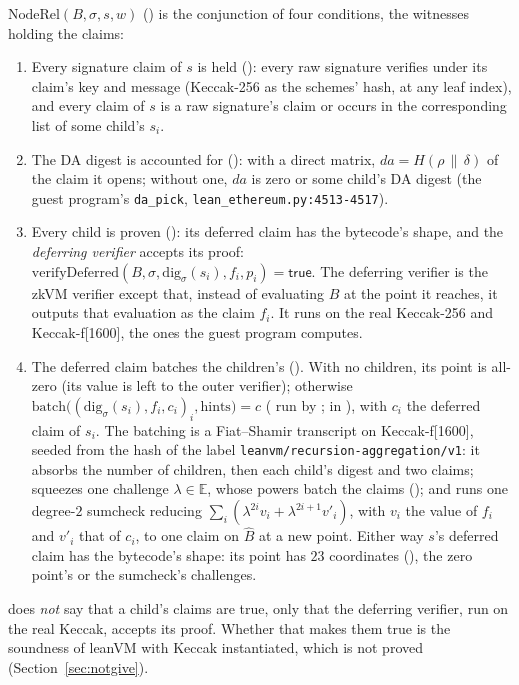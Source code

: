 \documentclass[11pt]{article}
\begin{document}
$\mathrm{NodeRel}(B, \sigma, s, w)$ () is the conjunction of four conditions,
the witnesses holding the claims:
\begin{enumerate}
\item Every signature claim of $s$ is held (): every raw signature verifies
under its claim's key and message (Keccak-256 as the schemes' hash, at any leaf index), and every
claim of $s$ is a raw signature's claim or occurs in the corresponding list of some child's $s_i$.
\item The DA digest is accounted for (): with a direct matrix,
$\mathit{da} = H(\rho \,\|\, \delta)$ of the claim it opens; without one, $\mathit{da}$ is zero or
some child's DA digest (the guest program's \texttt{da\_pick}, \texttt{lean\_ethereum.py:4513-4517}).
\item Every child is proven (): its deferred claim has the bytecode's shape,
and the \emph{deferring verifier} accepts its proof: $\mathrm{verifyDeferred}(B, \sigma,
\mathrm{dig}_\sigma(s_i), f_i, p_i) = \mathsf{true}$. The deferring verifier is the zkVM verifier
except that, instead of evaluating $\widehat{B}$ at the point it reaches, it outputs that evaluation
as the claim $f_i$. It runs on the real Keccak-256 and Keccak-f[1600], the ones the guest program
computes.
\item The deferred claim batches the children's (). With no children, its
point is all-zero (its value is left to the outer verifier); otherwise $\mathrm{batch}\big(
(\mathrm{dig}_\sigma(s_i), f_i, c_i)_i, \text{hints}\big) = c$ ( run by
;  in ), with $c_i$ the deferred claim of $s_i$. The
batching is a Fiat--Shamir transcript on Keccak-f[1600], seeded from the hash of the label
\texttt{leanvm/recursion-aggregation/v1}: it absorbs the number of children, then each child's
digest and two claims; squeezes one challenge $\lambda \in \mathbb{E}$, whose powers batch the
claims (); and runs one degree-$2$ sumcheck reducing
$\sum_i (\lambda^{2i} v_i + \lambda^{2i+1} v'_i)$, with $v_i$
the value of $f_i$ and $v'_i$ that of $c_i$, to one claim on $\widehat{B}$ at a new point.
Either way $s$'s deferred claim has the bytecode's shape: its point has $23$ coordinates
(), the zero point's or the sumcheck's challenges.
\end{enumerate}
 does \emph{not} say that a child's claims are true, only that the deferring verifier,
run on the real Keccak, accepts its proof. Whether that makes them true is the soundness of leanVM
with Keccak instantiated, which is not proved (Section~\ref{sec:notgive}).
\end{document}
